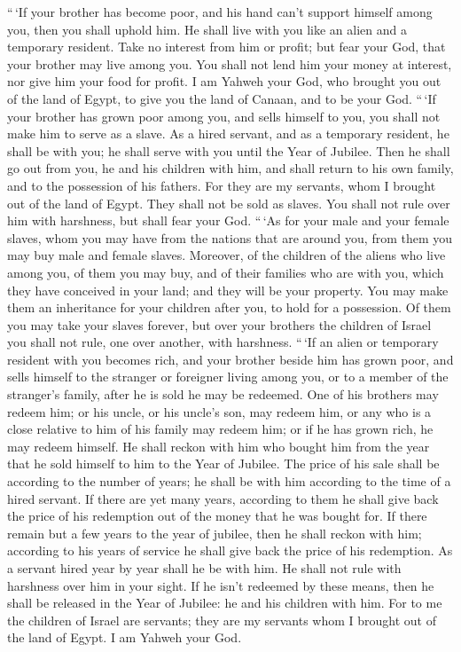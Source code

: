  ``\,`If your brother has become poor, and his hand can't
support himself among you, then you shall uphold him. He shall live with
you like an alien and a temporary resident.  Take no
interest from him or profit; but fear your God, that your brother may
live among you.  You shall not lend him your money at
interest, nor give him your food for profit.  I am Yahweh
your God, who brought you out of the land of Egypt, to give you the land
of Canaan, and to be your God.  ``\,`If your brother has
grown poor among you, and sells himself to you, you shall not make him
to serve as a slave.  As a hired servant, and as a
temporary resident, he shall be with you; he shall serve with you until
the Year of Jubilee.  Then he shall go out from you, he
and his children with him, and shall return to his own family, and to
the possession of his fathers.  For they are my servants,
whom I brought out of the land of Egypt. They shall not be sold as
slaves.  You shall not rule over him with harshness, but
shall fear your God.  ``\,`As for your male and your
female slaves, whom you may have from the nations that are around you,
from them you may buy male and female slaves.  Moreover,
of the children of the aliens who live among you, of them you may buy,
and of their families who are with you, which they have conceived in
your land; and they will be your property.  You may make
them an inheritance for your children after you, to hold for a
possession. Of them you may take your slaves forever, but over your
brothers the children of Israel you shall not rule, one over another,
with harshness.  ``\,`If an alien or temporary resident
with you becomes rich, and your brother beside him has grown poor, and
sells himself to the stranger or foreigner living among you, or to a
member of the stranger's family,  after he is sold he may
be redeemed. One of his brothers may redeem him;  or his
uncle, or his uncle's son, may redeem him, or any who is a close
relative to him of his family may redeem him; or if he has grown rich,
he may redeem himself.  He shall reckon with him who
bought him from the year that he sold himself to him to the Year of
Jubilee. The price of his sale shall be according to the number of
years; he shall be with him according to the time of a hired servant.
 If there are yet many years, according to them he shall
give back the price of his redemption out of the money that he was
bought for.  If there remain but a few years to the year
of jubilee, then he shall reckon with him; according to his years of
service he shall give back the price of his redemption. 
As a servant hired year by year shall he be with him. He shall not rule
with harshness over him in your sight.  If he isn't
redeemed by these means, then he shall be released in the Year of
Jubilee: he and his children with him.  For to me the
children of Israel are servants; they are my servants whom I brought out
of the land of Egypt. I am Yahweh your God.

